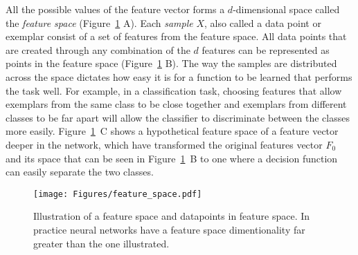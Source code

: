 All the possible values of the feature vector forms a $d$-dimensional space called the \textit{feature space} (Figure~\ref{fig:space} A). Each \textit{sample} $X$, also called a data point or exemplar consist of a set of features from the feature space. All data points that are created through any combination of the $d$ features can be represented as points in the feature space (Figure~\ref{fig:space} B). The way the samples are distributed across the space dictates how easy it is for a function to be learned that performs the task well. For example, in a classification task, choosing features that allow exemplars from the same class to be close together and exemplars from different classes to be far apart will allow the classifier to discriminate between the classes more easily. Figure~\ref{fig:space}~C shows a hypothetical feature space of a feature vector deeper in the network, which have transformed the original features vector $F_0$ and its space that can be seen in Figure~\ref{fig:space}~B to one where a decision function can easily separate the two classes. 



\begin{figure}[ht!]
	\begin{center}
		\texttt{[image: Figures/feature\_space.pdf]}
	\end{center}
	\caption{Illustration of a feature space and datapoints in feature space. In practice neural networks have a feature space dimentionality far greater than the one illustrated.}
	\label{fig:space}
\end{figure} 


